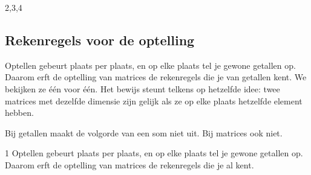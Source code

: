 
\begin{alleenvoor}{2,3,4}
\subsection{Rekenregels voor de optelling}

Optellen gebeurt plaats per plaats, en op elke plaats tel je gewone getallen op. Daarom erft de optelling van matrices de rekenregels die je van getallen kent. We bekijken ze één voor één. Het bewijs steunt telkens op hetzelfde idee: twee matrices met dezelfde dimensie zijn gelijk als ze op elke plaats hetzelfde element hebben.

Bij getallen maakt de volgorde van een som niet uit. Bij matrices ook niet.
\end{alleenvoor}
\begin{alleenvoor}{1}
Optellen gebeurt plaats per plaats, en op elke plaats tel je gewone getallen op. Daarom erft de optelling van matrices de rekenregels die je al kent.
\end{alleenvoor}

